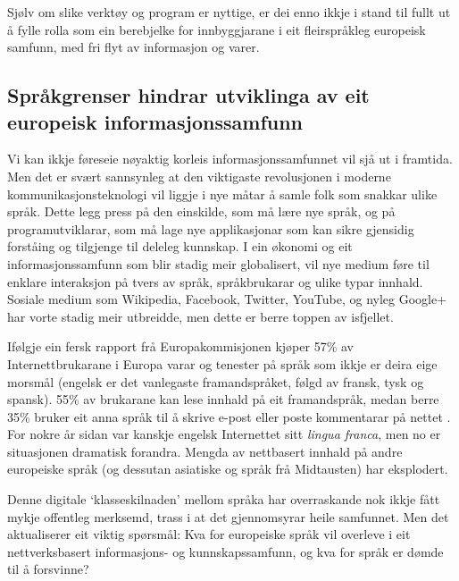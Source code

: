 \begin{multicols}{2}
Sjølv om slike verktøy og program er nyttige, er dei enno ikkje i stand til fullt ut å fylle rolla som ein berebjelke for innbyggjarane i eit fleirspråkleg europeisk samfunn, med fri flyt av informasjon og varer. 

\subsection[Språkgrenser hindrar utviklinga av eit europeisk informasjonssamfunn]{Språkgrenser hindrar utviklinga av eit europeisk informasjonssamfunn }

Vi kan ikkje føreseie nøyaktig korleis informasjonssamfunnet vil sjå ut i framtida. Men det er svært sannsynleg at den viktigaste revolusjonen i moderne kommunikasjonsteknologi vil liggje i nye måtar å samle folk som snakkar ulike språk. Dette legg press på den einskilde, som må lære nye språk, og på programutviklarar, som må lage nye applikasjonar som kan sikre gjensidig forståing og tilgjenge til deleleg kunnskap. I ein økonomi og eit informasjonssamfunn som blir stadig meir globalisert, vil nye medium føre til enklare interaksjon på tvers av språk, språkbrukarar og ulike typar innhald. Sosiale medium som Wikipedia, Facebook, Twitter, YouTube, og nyleg Google+ har vorte stadig meir utbreidde, men dette er berre toppen av isfjellet.


Ifølgje ein fersk rapport frå Europakommisjonen kjøper 57\% av Internettbrukarane i Europa varar og tenester på språk som ikkje er deira eige morsmål (engelsk er det vanlegaste framandspråket, følgd av fransk, tysk og spansk). 55\% av brukarane kan lese innhald på eit framandspråk, medan berre 35\% bruker eit anna språk til å skrive e-post eller poste kommentarar på nettet \cite{EC1}. For nokre år sidan var kanskje engelsk Internettet sitt \textit{lingua franca}, men no er situasjonen dramatisk forandra. Mengda av nettbasert innhald på andre europeiske språk (og dessutan asiatiske og språk frå Midtausten) har eksplodert. 

Denne digitale `klasseskilnaden' mellom språka har overraskande nok ikkje fått mykje offentleg merksemd, trass i at det gjennomsyrar heile samfunnet. Men det aktualiserer eit viktig spørsmål: Kva for europeiske språk vil overleve i eit nettverksbasert informasjons- og kunnskapssamfunn, og kva for språk er dømde til å forsvinne?


\end{multicols}
